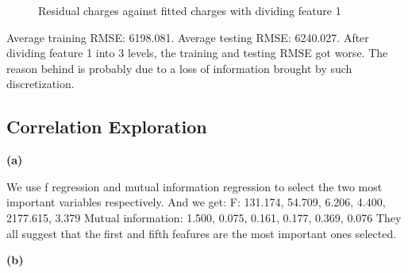 \documentclass{article}
\begin{document}
\begin{figure}[!htbp]
\centering
{}
\caption{Residual charges against fitted charges with dividing feature 1} \label{3_1_c_2}
\end{figure}

Average training RMSE: 6198.081.\newline
\indent Average testing RMSE: 6240.027.\newline
\indent After dividing feature 1 into 3 levels, the training and testing RMSE got worse. The reason behind is probably due to a loss of information brought by such discretization.\bigbreak

\subsection{Correlation Exploration}

\noindent \textbf{(a)} \bigbreak

We use f regression and mutual information regression to select the two most important variables respectively. And we get:\newline
\indent F: 131.174, 54.709, 6.206, 4.400, 2177.615, 3.379\newline
\indent Mutual information: 1.500, 0.075, 0.161, 0.177, 0.369, 0.076\newline
\indent They all suggest that the first and fifth feafures are the most important ones selected.\bigbreak

\noindent \textbf{(b)} \bigbreak
\end{document}
